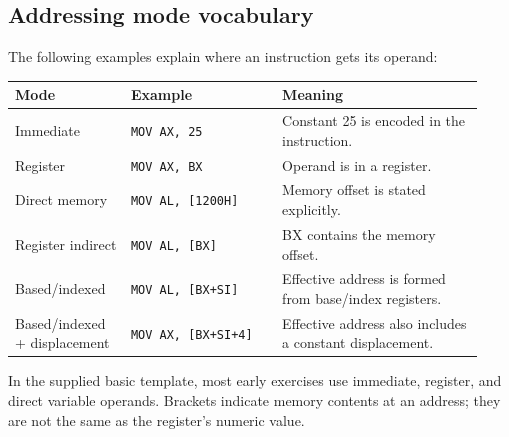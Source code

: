 \documentclass[11pt,a4paper]{article}
\begin{document}
\subsection{Addressing mode vocabulary}
The following examples explain where an instruction gets its operand:
\begin{longtable}{p{0.23\linewidth}p{0.3\linewidth}p{0.4\linewidth}}
\toprule \textbf{Mode} & \textbf{Example} & \textbf{Meaning}\\
\midrule
Immediate & \texttt{MOV AX, 25} & Constant 25 is encoded in the instruction.\\
Register & \texttt{MOV AX, BX} & Operand is in a register.\\
Direct memory & \texttt{MOV AL, [1200H]} & Memory offset is stated explicitly.\\
Register indirect & \texttt{MOV AL, [BX]} & BX contains the memory offset.\\
Based/indexed & \texttt{MOV AL, [BX+SI]} & Effective address is formed from base/index registers.\\
Based/indexed + displacement & \texttt{MOV AX, [BX+SI+4]} & Effective address also includes a constant displacement.\\
\bottomrule
\end{longtable}
In the supplied basic template, most early exercises use immediate, register, and direct variable operands. Brackets indicate memory contents at an address; they are not the same as the register's numeric value.
\end{document}
